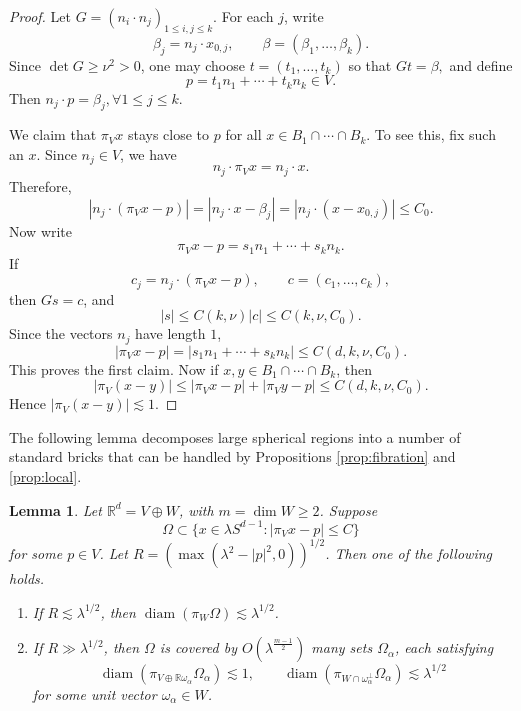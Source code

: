 \documentclass[11pt,reqno]{amsart}
\newtheorem{lemma}[theorem]{Lemma}
\numberwithin{equation}{section}
\newcommand{\1}{\textbf{1}}
\newcommand{\ls}{\lesssim}
\newcommand{\R}{\mathbb R}
\newcommand{\la}{\lambda}
\begin{document}
	\begin{proof} Let $G=(n_i\cdot n_j)_{1\le i,j\le k}$.
		For each \(j\), write
		\[
		\beta_j=n_j\cdot x_{0,j},
		\qquad
		\beta=(\beta_1,\ldots,\beta_k).
		\]
		Since \(\det G\ge\nu^2>0\), one may choose \(t=(t_1,\ldots,t_k)\) so that
		\(
		Gt=\beta,
		\)
		and define
		\[
		p=t_1n_1+\cdots+t_kn_k\in V.
		\]
		Then
		\(
		n_j\cdot p=\beta_j, \forall 1\leq j \leq k.
		\)
		
		We claim that \(\pi_Vx\) stays close to \(p\) for all
		\(x\in B_1\cap\cdots\cap B_k\).  To see this, fix such an \(x\).  Since
		\(n_j\in V\), we have
		\[
		n_j\cdot \pi_Vx=n_j\cdot x.
		\]
		Therefore,
		\[
		|n_j\cdot(\pi_Vx-p)|
		=
		|n_j\cdot x-\beta_j|
		=
		|n_j\cdot(x-x_{0,j})|
		\le C_0.
		\]
		Now write
		\[
		\pi_Vx-p=s_1n_1+\cdots+s_kn_k.
		\]
		If
		\[
		c_j=n_j\cdot(\pi_Vx-p),
		\qquad
		c=(c_1,\ldots,c_k),
		\]
		then $Gs=c$, and
		\[
		|s|\le C(k,\nu)|c|\le C(k,\nu,C_0).
		\]
		Since the vectors \(n_j\) have length \(1\),
		\[
		|\pi_Vx-p|
		=
		|s_1n_1+\cdots+s_kn_k|
		\le C(d,k,\nu,C_0).
		\]
		This proves the first claim. Now if \(x,y\in B_1\cap\cdots\cap B_k\), then
		\[
		|\pi_V(x-y)|
		\le |\pi_Vx-p|+|\pi_Vy-p|
		\le C(d,k,\nu,C_0).
		\]
		Hence \( |\pi_V(x-y)|\ls 1 \).
	\end{proof}
	The following lemma decomposes large spherical regions into a number of standard bricks that can be handled by Propositions \ref{prop:fibration} and \ref{prop:local}.
	\begin{lemma}\label{lem:shell}
		Let \(\R^d=V\oplus W\), with \(m=\dim W\ge2\). Suppose
		\[
		\Omega\subset\{x\in\la S^{d-1}:|\pi_Vx-p|\le C\}
		\]
		for some \(p\in V\).  Let \(R=(\max(\la^2-|p|^2,0))^{1/2}\).
		Then one of the following holds.
		\begin{enumerate}
			\item[(i)] If \(R\ls\la^{1/2}\), then
			\(\operatorname{diam}(\pi_W\Omega)\ls\la^{1/2}\).
			\item[(ii)] If \(R\gg \la^{1/2}\), then \(\Omega\) is covered by
			\(O(\la^{\frac{m-1}2})\) many sets \(\Omega_\alpha\), each satisfying
			\[
			\operatorname{diam}(\pi_{V\oplus\R\omega_\alpha}\Omega_\alpha)\ls1,
			\qquad
			\operatorname{diam}(\pi_{W\cap\omega_\alpha^\perp}\Omega_\alpha)
			\ls\la^{1/2}
			\]
			for some unit vector \(\omega_\alpha\in W\).
		\end{enumerate}
	\end{lemma}
	
\end{document}
